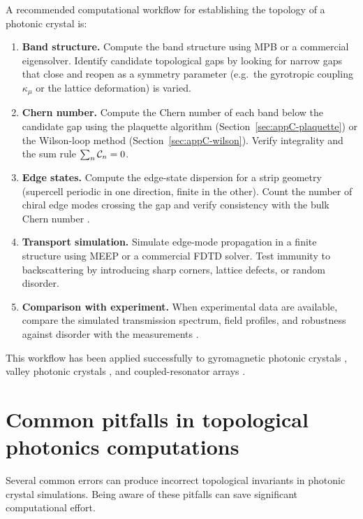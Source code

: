 A recommended computational workflow for establishing the topology
of a photonic crystal is:

\begin{enumerate}
  \item \textbf{Band structure.}  Compute the band structure using MPB
    or a commercial eigensolver.  Identify candidate topological gaps
    by looking for narrow gaps that close and reopen as a symmetry
    parameter (e.g.\ the gyrotropic coupling $\kappa_\mu$ or the
    lattice deformation) is varied.
  \item \textbf{Chern number.}  Compute the Chern number of each
    band below the candidate gap using the plaquette algorithm
    (Section~\ref{sec:appC-plaquette}) or the Wilson-loop method
    (Section~\ref{sec:appC-wilson}).  Verify integrality and the
    sum rule $\sum_n\mathcal{C}_n=0$.
  \item \textbf{Edge states.}  Compute the edge-state dispersion
    for a strip geometry (supercell periodic in one direction, finite
    in the other).  Count the number of chiral edge modes crossing
    the gap and verify consistency with the bulk Chern number
    \cite{paz2019tutorial,chen2023berry}.
  \item \textbf{Transport simulation.}  Simulate edge-mode
    propagation in a finite structure using MEEP or a commercial
    FDTD solver.  Test immunity to backscattering by introducing
    sharp corners, lattice defects, or random disorder.
  \item \textbf{Comparison with experiment.}  When experimental
    data are available, compare the simulated transmission spectrum,
    field profiles, and robustness against disorder with the
    measurements \cite{hafezi2013imaging,he2019silicon}.
\end{enumerate}

This workflow has been applied successfully to gyromagnetic photonic
crystals \cite{nature2026observation}, valley photonic crystals
\cite{gao2017topologically,ma2017scattering}, and coupled-resonator
arrays \cite{hafezi2013imaging}.

\section{Common pitfalls in topological photonics computations}
\label{sec:appC-pitfalls}

Several common errors can produce incorrect topological invariants
in photonic crystal simulations.  Being aware of these pitfalls
can save significant computational effort.

